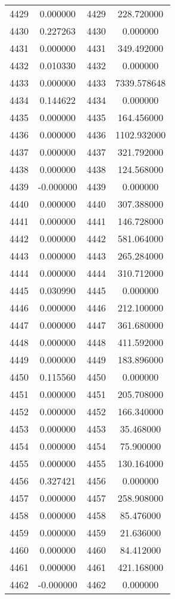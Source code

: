 \documentclass[12pt]{article}
\begin{document}
\begin{longtable}{@{}cccc@{}}
4429 & 0.000000 & 4429 & 228.720000 \\
4430 & 0.227263 & 4430 & 0.000000 \\
4431 & 0.000000 & 4431 & 349.492000 \\
4432 & 0.010330 & 4432 & 0.000000 \\
4433 & 0.000000 & 4433 & 7339.578648 \\
4434 & 0.144622 & 4434 & 0.000000 \\
4435 & 0.000000 & 4435 & 164.456000 \\
4436 & 0.000000 & 4436 & 1102.932000 \\
4437 & 0.000000 & 4437 & 321.792000 \\
4438 & 0.000000 & 4438 & 124.568000 \\
4439 & -0.000000 & 4439 & 0.000000 \\
4440 & 0.000000 & 4440 & 307.388000 \\
4441 & 0.000000 & 4441 & 146.728000 \\
4442 & 0.000000 & 4442 & 581.064000 \\
4443 & 0.000000 & 4443 & 265.284000 \\
4444 & 0.000000 & 4444 & 310.712000 \\
4445 & 0.030990 & 4445 & 0.000000 \\
4446 & 0.000000 & 4446 & 212.100000 \\
4447 & 0.000000 & 4447 & 361.680000 \\
4448 & 0.000000 & 4448 & 411.592000 \\
4449 & 0.000000 & 4449 & 183.896000 \\
4450 & 0.115560 & 4450 & 0.000000 \\
4451 & 0.000000 & 4451 & 205.708000 \\
4452 & 0.000000 & 4452 & 166.340000 \\
4453 & 0.000000 & 4453 & 35.468000 \\
4454 & 0.000000 & 4454 & 75.900000 \\
4455 & 0.000000 & 4455 & 130.164000 \\
4456 & 0.327421 & 4456 & 0.000000 \\
4457 & 0.000000 & 4457 & 258.908000 \\
4458 & 0.000000 & 4458 & 85.476000 \\
4459 & 0.000000 & 4459 & 21.636000 \\
4460 & 0.000000 & 4460 & 84.412000 \\
4461 & 0.000000 & 4461 & 421.168000 \\
4462 & -0.000000 & 4462 & 0.000000 \\

\end{longtable}
\end{document}
